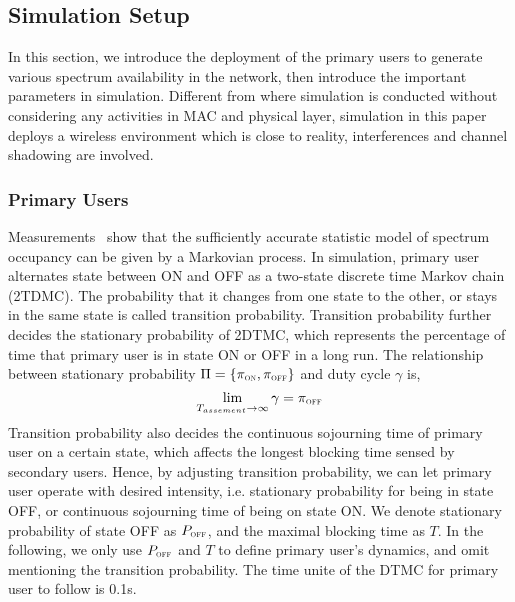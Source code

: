 \subsection{Simulation Setup}
In this section, we introduce the deployment of the primary users to generate various spectrum availability in the network, then introduce the important parameters in simulation.
Different from \cite{gpsfree05infocom} where simulation is conducted without considering any activities in MAC and physical layer, simulation in this paper deploys a wireless environment which is close to reality, \eg interferences and channel shadowing are involved.


\subsubsection*{Primary Users}
Measurements~\cite{ProbabilityAndComputing, dsa_model_markov_2006} show that the sufficiently accurate statistic model of spectrum occupancy can be given by a Markovian process.
In simulation, primary user alternates state between ON and OFF as a two-state discrete time Markov chain (2TDMC).
The probability that it changes from one state to the other, or stays in the same state is called transition probability.
Transition probability further decides the stationary probability of 2DTMC, which represents the percentage of time that primary user is in state ON or OFF in a long run.
The relationship between stationary probability $\Pi=\{\pi_{\textsc{\tiny ON}}, \pi_{\textsc{\tiny OFF}}\}$ and duty cycle $\gamma$ is, 
\begin{equation}
\label{stationary_probability}
\lim\limits_{T_{assement} \to \infty }{\gamma} = \pi_{\textsc{\tiny OFF}}
\end{equation}
Transition probability also decides the continuous sojourning time of primary user on a certain state, which affects the longest blocking time sensed by secondary users.
Hence, by adjusting transition probability, we can let primary user operate with desired intensity, i.e. stationary probability for being in state OFF, or continuous sojourning time of being on state ON.
We denote stationary probability of state OFF as $P_{\textsc{\tiny OFF}}$, and the maximal blocking time as $T$.
In the following, we only use $P_{\textsc{\tiny OFF}}$ and $T$ to define primary user's dynamics, and omit mentioning the transition probability.
The time unite of the DTMC for primary user to follow is 0.1s.

